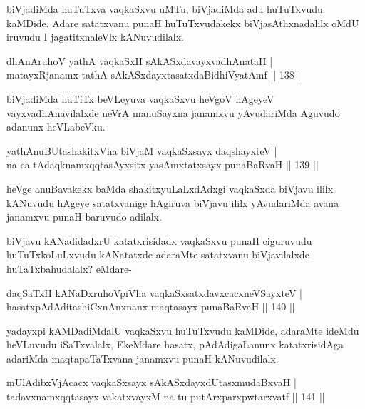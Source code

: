 \begin{artha}
biVjadiMda huTuTxva vaqkaSxvu uMTu, biVjadiMda adu huTuTxvudu kaMDide. Adare satatxvanu punaH huTuTxvudakekx biVjasAthxnadalilx oMdU iruvudu I jagatitxnaleVlx kANuvudilalx.
\end{artha}%

\begin{shl}
dhAnAruhoV yathA vaqkaSxH sAkASxdavayxvadhAnataH |\\
matayxRjanamx tathA sAkASxdayxtasatxdaBidhiVyatAmf \hfill || 138 ||
\end{shl}

\begin{artha}
biVjadiMda huTiTx beVLeyuva vaqkaSxvu heVgoV hAgeyeV vayxvadhAnavilalxde neVrA manuSayxna janamxvu yAvudariMda Aguvudo adanunx heVLabeVku.
\end{artha}

\begin{shl}
yathA\s nuBUtashakitxVha biVjaM vaqkaSxsayx daqshayxteV |\\
na ca tAdaqknamxqqtasAyxsitx yasAmxtatxsayx punaBaRvaH \hfill || 139 ||
\end{shl}

\begin{artha}
heVge anuBavakekx baMda shakitxyuLaLxdAdxgi vaqkaSxda biVjavu ililx kANuvudu hAgeye satatxvanige hAgiruva biVjavu ililx yAvudariMda avana janamxvu punaH baruvudo adilalx.

biVjavu kANadidadxrU katatxrisidadx vaqkaSxvu punaH ciguruvudu huTuTxkoLuLxvudu kANatatxde adaraMte satatxvanu biVjavilalxde huTaTxbahudalalx? eMdare-
\end{artha}

\begin{shl}
daqSaTxH kANaDxruhoV\s piVha vaqkaSxsatxdavxcacxneVSayxteV |\\
hasatxpAdAditashiCxnAnxnanx maqtasayx punaBaRvaH \hfill || 140 ||
\end{shl}

\begin{artha}
yadayxpi kAMDadiMdalU vaqkaSxvu huTuTxvudu kaMDide, adaraMte ideMdu heVLuvudu iSaTxvalalx, EkeMdare hasatx, pAdAdigaLanunx katatxrisidAga adariMda maqtapaTaTxvana janamxvu punaH kANuvudilalx.
\end{artha}


\begin{shl}
mUlAdibxVjAcacx vaqkaSxsayx sAkASxdayxdUtasxmudaBxvaH |\\
tadavxnamxqqtasayx vakatxvayxM na tu putArxparxpwtarxvatf \hfill || 141 ||
\end{shl}

